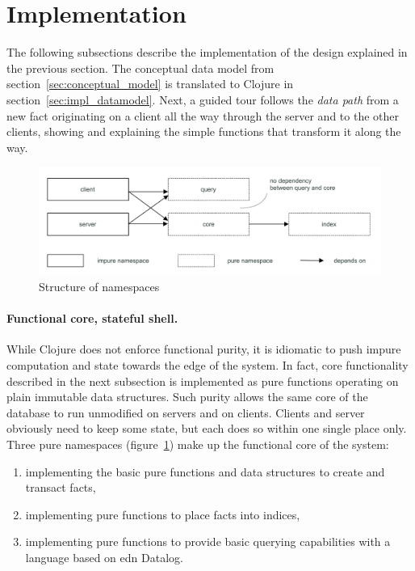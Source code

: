 \section{Implementation}\label{sec:implementation}

The following subsections describe the implementation of the design explained in the previous section. The conceptual data model from section~\ref{sec:conceptual_model} is translated to Clojure in section~\ref{sec:impl_datamodel}. Next, a guided tour follows the \emph{data path} from a new fact originating on a client all the way through the server and to the other clients, showing and explaining the simple functions that transform it along the way.


\begin{figure}[!ht]
  \includegraphics[width=\linewidth]{images/namespaces.pdf}
  \caption{Structure of namespaces}
  \label{fig:namespaces}
\end{figure}


\paragraph{Functional core, stateful shell.}
While Clojure does not enforce functional purity, it is idiomatic to push impure computation and state towards the edge of the system. In fact, core functionality described in the next subsection is implemented as pure functions operating on plain immutable data structures. Such purity allows the same core of the database to run unmodified on servers and on clients. Clients and server obviously need to keep some state, but each does so within one single place only. Three pure namespaces (figure~\ref{fig:namespaces}) make up the functional core of the system:

\begin{enumerate}[label={(\roman*)}]
  \item {} implementing the basic pure functions and data structures to create and transact facts,
  \item {} implementing pure functions to place facts into indices,
  \item {} implementing pure functions to provide basic querying capabilities with a language based on edn Datalog.
\end{enumerate}

